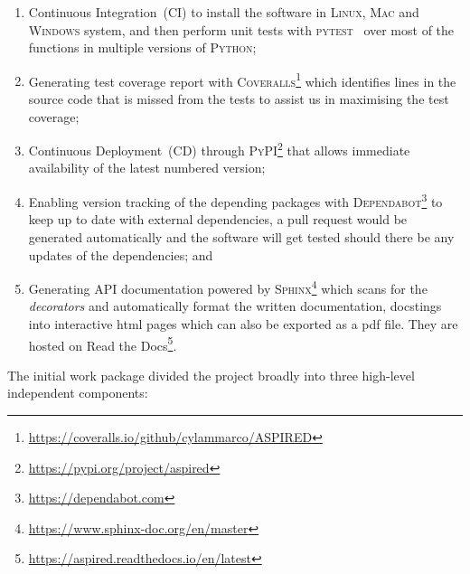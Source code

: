 \documentclass[linenumbers, twocolumn]{aastex631}
\begin{document}
\begin{enumerate}
    \item Continuous Integration~(CI) to install the software in \textsc{Linux},
    \textsc{Mac} and \textsc{Windows} system, and then perform unit tests with
    \textsc{pytest}~\citep{pytest6.2} over most of the functions in multiple
    versions of \textsc{Python};
    \item Generating test coverage report with \textsc{Coveralls}\footnote{\url{
    https://coveralls.io/github/cylammarco/ASPIRED}} which identifies lines in
    the source code that is missed from the tests to assist us in maximising the
    test coverage;
    \item Continuous Deployment~(CD) through \textsc{PyPI}\footnote{\url{
    https://pypi.org/project/aspired}} that allows immediate availability of the
    latest numbered version;
    \item Enabling version tracking of the depending packages with 
    \textsc{Dependabot}\footnote{\url{
    https://dependabot.com}} to keep up to date with external dependencies, a
    pull request would be generated automatically and the software will get
    tested should there be any updates of the dependencies; and
    \item Generating API documentation powered by \textsc{Sphinx}\footnote{\url{
    https://www.sphinx-doc.org/en/master}} which scans for the \textit{decorators}
    and automatically format the written documentation, docstings into
    interactive html pages which can also be exported as a pdf file. They are
    hosted on Read the Docs\footnote{\url{
    https://aspired.readthedocs.io/en/latest}}.
\end{enumerate}

The initial work package divided the project broadly into three high-level
independent components:

\end{document}
